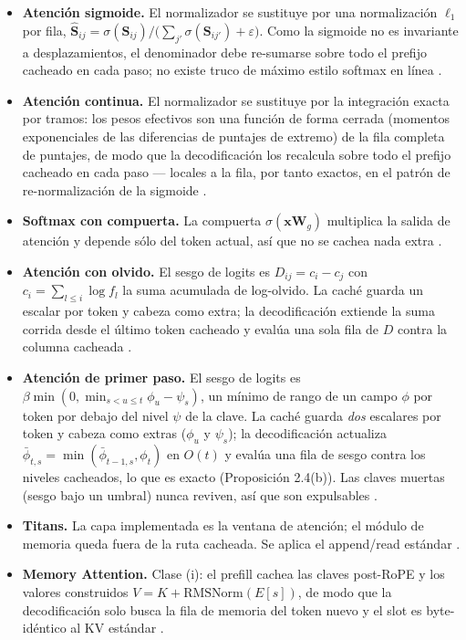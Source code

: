 \begin{itemize}[leftmargin=*]
    \item \textbf{Atención sigmoide.} El normalizador se sustituye por una normalización $\ell_1$ por fila, $\hat{\mathbf{S}}_{ij} = \sigma(\mathbf{S}_{ij}) / \big(\sum_{j'}\sigma(\mathbf{S}_{ij'}) + \varepsilon\big)$. Como la sigmoide no es invariante a desplazamientos, el denominador debe re-sumarse sobre todo el prefijo cacheado en cada paso; no existe truco de máximo estilo softmax en línea \citep{ramapuram_theory_2024}.
    \item \textbf{Atención continua.} El normalizador se sustituye por la integración exacta por tramos: los pesos efectivos son una función de forma cerrada (momentos exponenciales de las diferencias de puntajes de extremo) de la fila completa de puntajes, de modo que la decodificación los recalcula sobre todo el prefijo cacheado en cada paso --- locales a la fila, por tanto exactos, en el patrón de re-normalización de la sigmoide \citep{khadangi_continuum_2026}.
    \item \textbf{Softmax con compuerta.} La compuerta $\sigma(\mathbf{x}\mathbf{W}_g)$ multiplica la salida de atención y depende sólo del token actual, así que no se cachea nada extra \citep{qiu_gated_attention_2025}.
    \item \textbf{Atención con olvido.} El sesgo de logits es $D_{ij} = c_i - c_j$ con $c_i = \sum_{l\le i}\log f_l$ la suma acumulada de log-olvido. La caché guarda un escalar por token y cabeza como extra; la decodificación extiende la suma corrida desde el último token cacheado y evalúa una sola fila de $D$ contra la columna cacheada \citep{lin_forgetting_transformer_2025}.
    \item \textbf{Atención de primer paso.} El sesgo de logits es $\beta\min(0,\min_{s<u\le t}\phi_u-\psi_s)$, un mínimo de rango de un campo $\phi$ por token por debajo del nivel $\psi$ de la clave. La caché guarda \emph{dos} escalares por token y cabeza como extras ($\phi_u$ y $\psi_s$); la decodificación actualiza $\bar{\phi}_{t,s}=\min(\bar{\phi}_{t-1,s},\phi_t)$ en $O(t)$ y evalúa una fila de sesgo contra los niveles cacheados, lo que es exacto (Proposición 2.4(b)). Las claves muertas (sesgo bajo un umbral) nunca reviven, así que son expulsables \citep{liu_first_passage_2026}.
    \item \textbf{Titans.} La capa implementada es la ventana de atención; el módulo de memoria queda fuera de la ruta cacheada. Se aplica el append/read estándar \citep{behrouz_titans_2025}.
    \item \textbf{Memory Attention.} Clase (i): el prefill cachea las claves post-RoPE y los valores construidos $V = K + \mathrm{RMSNorm}(E[s])$, de modo que la decodificación solo busca la fila de memoria del token nuevo y el slot es byte-idéntico al KV estándar \citep{kang_memory_attention_2026}.

\end{itemize}

